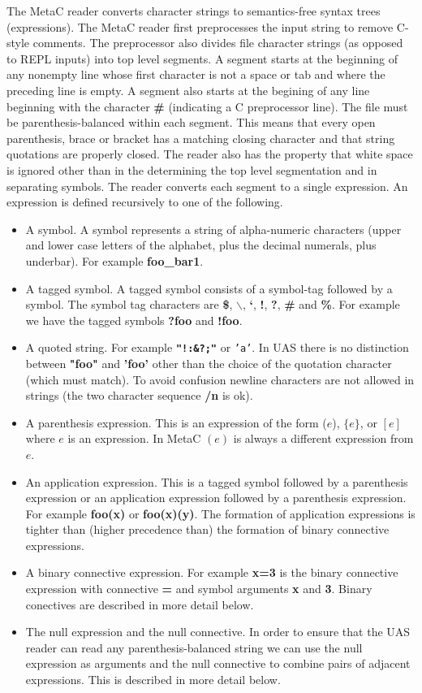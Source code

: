 \documentclass{article}
\begin{document}
The MetaC reader converts character strings to semantics-free syntax trees (expressions).
The MetaC reader first preprocesses the input string to remove C-style comments.
The preprocessor also divides file character strings (as opposed to REPL inputs) into top level segments.
A segment starts at the beginning of any nonempty line whose first character is not a space or tab and where the preceding line is empty.
A segment also starts at the begining of any line beginning with the character {\bf \#} (indicating a C preprocessor line).
The file must be parenthesis-balanced within each segment.  This means that every open parenthesis, brace or bracket has a matching closing character and that string quotations
are properly closed.  The reader also has the property that white space is ignored other than in the determining the top level segmentation and in separating symbols.
The reader converts each segment to a single expression.
An expression is defined recursively to one of the following.

\begin{itemize}
\item A symbol.  A symbol represents a string of alpha-numeric characters (upper and lower case letters of the alphabet, plus the decimal numerals, plus underbar).
  For example {\bf  foo\_bar1}.
\item A tagged symbol.  A tagged symbol consists of a symbol-tag followed by a symbol.  The symbol tag characters are {\bf \$}, {\bf $\backslash$}, {\bf `}, {\bf !}, {\bf ?}, {\bf \#} and {\bf \%}.
  For example we have the tagged symbols {\bf ?foo} and {\bf !foo}.
\item A quoted string.  For example {\bf \tt "!:\&?;"} or {\tt 'a'}.  In UAS there is no distinction between {\bf "foo"} and {\bf 'foo'} other than the choice of the quotation character (which must match).
  To avoid confusion newline characters are not allowed in strings (the two character sequence {\bf /n} is ok).
\item A parenthesis expression.  This is an expression of the form ($e$), $\{e\}$, or $[e]$ where $e$ is an expression.  In MetaC $(e)$ is always a different expression from $e$.
\item An application expression.  This is a tagged symbol followed by a parenthesis expression or an application expression followed by a parenthesis expression.  For example {\bf foo(x)} or {\bf foo(x)(y)}.
The formation of application expressions is tighter than (higher precedence than) the formation of binary connective expressions.
\item A binary connective expression.  For example {\bf x=3} is the binary connective expression with connective {\bf =} and symbol arguments {\bf x} and {\bf 3}.  Binary conectives are described in more detail below.
\item The null expression and the null connective. In order to ensure that the UAS reader can read any parenthesis-balanced string we can use the null
  expression as arguments and the null connective to combine pairs of adjacent expressions.  This is described in more detail below.
\end{itemize}
\end{document}
